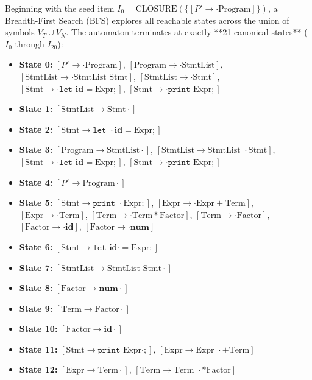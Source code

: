\documentclass[11pt,a4paper]{article}
\begin{document}
Beginning with the seed item $I_0 = \text{CLOSURE}(\{ [P' \to \cdot \text{Program}] \})$, a Breadth-First Search (BFS) explores all reachable states across the union of symbols $V_T \cup V_N$. The automaton terminates at exactly **21 canonical states** ($I_0$ through $I_{20}$):

\begin{itemize}\small
    \item \textbf{State 0:} $[P' \to \cdot \text{Program}]$, $[\text{Program} \to \cdot \text{StmtList}]$, $[\text{StmtList} \to \cdot \text{StmtList } \text{Stmt}]$, $[\text{StmtList} \to \cdot \text{Stmt}]$, $[\text{Stmt} \to \cdot \texttt{let } \mathbf{id} = \text{Expr} ;]$, $[\text{Stmt} \to \cdot \texttt{print } \text{Expr} ;]$
    \item \textbf{State 1:} $[\text{StmtList} \to \text{Stmt} \cdot]$
    \item \textbf{State 2:} $[\text{Stmt} \to \texttt{let } \cdot \mathbf{id} = \text{Expr} ;]$
    \item \textbf{State 3:} $[\text{Program} \to \text{StmtList} \cdot]$, $[\text{StmtList} \to \text{StmtList } \cdot \text{Stmt}]$, $[\text{Stmt} \to \cdot \texttt{let } \mathbf{id} = \text{Expr} ;]$, $[\text{Stmt} \to \cdot \texttt{print } \text{Expr} ;]$
    \item \textbf{State 4:} $[P' \to \text{Program} \cdot]$
    \item \textbf{State 5:} $[\text{Stmt} \to \texttt{print } \cdot \text{Expr} ;]$, $[\text{Expr} \to \cdot \text{Expr} + \text{Term}]$, $[\text{Expr} \to \cdot \text{Term}]$, $[\text{Term} \to \cdot \text{Term} * \text{Factor}]$, $[\text{Term} \to \cdot \text{Factor}]$, $[\text{Factor} \to \cdot \mathbf{id}]$, $[\text{Factor} \to \cdot \mathbf{num}]$
    \item \textbf{State 6:} $[\text{Stmt} \to \texttt{let } \mathbf{id} \cdot = \text{Expr} ;]$
    \item \textbf{State 7:} $[\text{StmtList} \to \text{StmtList } \text{Stmt} \cdot]$
    \item \textbf{State 8:} $[\text{Factor} \to \mathbf{num} \cdot]$
    \item \textbf{State 9:} $[\text{Term} \to \text{Factor} \cdot]$
    \item \textbf{State 10:} $[\text{Factor} \to \mathbf{id} \cdot]$
    \item \textbf{State 11:} $[\text{Stmt} \to \texttt{print } \text{Expr} \cdot ;]$, $[\text{Expr} \to \text{Expr } \cdot + \text{Term}]$
    \item \textbf{State 12:} $[\text{Expr} \to \text{Term} \cdot]$, $[\text{Term} \to \text{Term } \cdot * \text{Factor}]$

\end{itemize}
\end{document}

